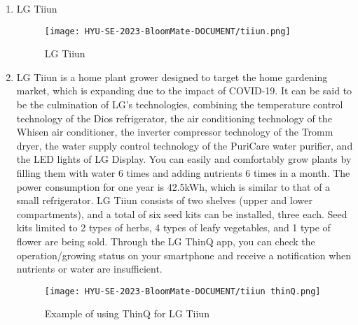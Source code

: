 \documentclass[conference, a4paper]{IEEEtran}
\begin{document}
\begin{enumerate}
\item LG Tiiun
\begin{figure}[h]
\texttt{[image: HYU-SE-2023-BloomMate-DOCUMENT/tiiun.png]}
\label{fig:tiiun}
\caption{LG Tiiun} 
\end{figure}
\item[] LG Tiiun is a home plant grower designed to target the home gardening market, which is expanding due to the impact of COVID-19. It can be said to be the culmination of LG's technologies, combining the temperature control technology of the Dios refrigerator, the air conditioning technology of the Whisen air conditioner, the inverter compressor technology of the Tromm dryer, the water supply control technology of the PuriCare water purifier, and the LED lights of LG Display. You can easily and comfortably grow plants by filling them with water 6 times and adding nutrients 6 times in a month. The power consumption for one year is 42.5kWh, which is similar to that of a small refrigerator. LG Tiiun consists of two shelves (upper and lower compartments), and a total of six seed kits can be installed, three each. Seed kits limited to 2 types of herbs, 4 types of leafy vegetables, and 1 type of flower are being sold. Through the LG ThinQ app, you can check the operation/growing status on your smartphone and receive a notification when nutrients or water are insufficient. \\
\begin{figure}[h]
\texttt{[image: HYU-SE-2023-BloomMate-DOCUMENT/tiiun thinQ.png]}
\label{fig:tiiunThinQ}
\caption{Example of using ThinQ for LG Tiiun} 
\end{figure}
\end{enumerate}
\end{document}
